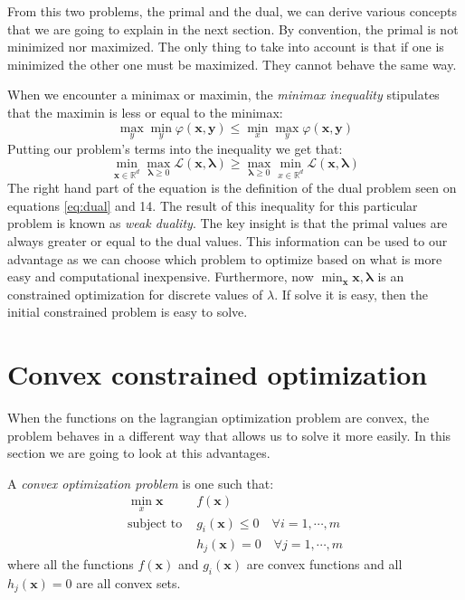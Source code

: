 \documentclass[]{article}
\theoremstyle{definition}
\begin{document}
From this two problems, the primal and the dual, we can derive various concepts that we are going to explain in the next section. By convention, the primal is not minimized nor maximized. The only thing to take into account is that if one is minimized the other one must be maximized. They cannot behave the same way.

When we encounter a minimax or maximin, the \textit{minimax inequality} stipulates that the maximin is less or equal to the minimax:
\begin{equation*}
	\max_y\min_y \varphi(\boldsymbol{x}, \boldsymbol{y}) \leq \min_x \max_y \varphi(\boldsymbol{x}, \boldsymbol{y})
\end{equation*}
Putting our problem's terms into the inequality we get that:
\begin{equation*}
	\min_{\boldsymbol{x}\in\mathbb{R}^d}\max_{\boldsymbol{\lambda}\geq0}\mathcal{L}(\boldsymbol{x}, \boldsymbol{\lambda})	\geq  \max_{\boldsymbol{\lambda}\geq0} \min_{x\in\mathbb{R}^d} \mathcal{L}(\boldsymbol{x}, \boldsymbol{\lambda})
\end{equation*}
The right hand part of the equation is the definition of the dual problem seen on equations \ref{eq:dual} and 14. The result of this inequality for this particular problem is known as \textit{weak duality}. The key insight is that the primal values are always greater or equal to the dual values. This information can be used to our advantage as we can choose which problem to optimize based on what is more easy and computational inexpensive. Furthermore, now $\min_{\boldsymbol{x}}\mathcal{\boldsymbol{x}, \boldsymbol{\lambda}}$ is an constrained optimization for discrete values of $\lambda$. If solve it is easy, then the initial constrained problem is easy to solve. 


\section{Convex constrained optimization}
When the functions on the lagrangian optimization problem are convex, the problem behaves in a different way that allows us to solve it more easily. In this section we are going to look at this advantages. 

A \textit{convex optimization problem} is one such that:
\begin{align}
	\min_x\boldsymbol{x} &f(\boldsymbol{x}) \\
	\text{subject to } &g_i(\boldsymbol{x}) \leq 0 \quad \forall  i = 1, \cdots, m \\
	&h_j(\boldsymbol{x}) = 0 \quad \forall j = 1, \cdots, m 
\end{align}
where all the functions $f(\boldsymbol{x})$ and $g_i(\boldsymbol{x})$ are convex functions and all $h_j(\boldsymbol{x}) = 0$ are all convex sets.
\end{document}
